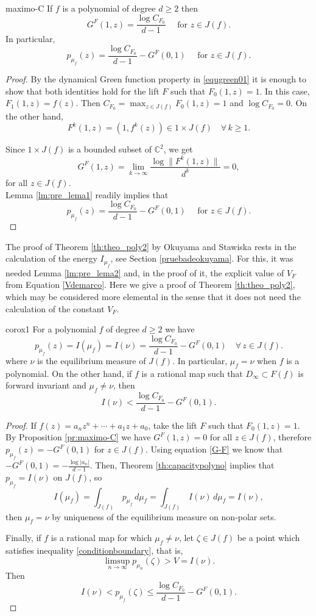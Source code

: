 \begin{myprop}{}{maximo-C}
If $f$ is a polynomial of degree $d\geq 2$ then
$$ G^F(1,z) =  \frac{\log C_{F_0}}{d-1} \quad \text{ for } z\in J(f).$$
In particular,
$$p_{\mu_f}(z) = \frac{\log C_{F_0}}{d-1}-G^F(0,1) \quad \text{ for } z\in J(f).$$
\end{myprop}
\begin{proof}
By the dynamical Green function property in \eqref{equgreen01} it is enough to show that both identities hold for the lift $F$ such that $F_0(1,z)=1$. In this case, $F_1(1,z)=f(z)$. Then $C_{F_0}=\max_{z\in J(f)}F_0(1,z)=1$ and $\log C_{F_0}=0$. On the other hand,
$$F^k(1,z) = (1,f^k(z))\in 1\times J(f) \quad \forall\, k\geq 1.$$

Since $1\times J(f)$ is a bounded subset of $\mathbb{C}^2$, we get
$$G^F(1,z) = \lim_{k\rightarrow \infty} \frac{\log\|F^k(1,z)\|}{d^k}=0,$$
for all $z\in J(f)$.\\

Lemma \ref{lm:pre_lema1} readily implies that
$$p_{\mu_f}(z) = \frac{\log C_{F_0}}{d-1}-G^F(0,1) \quad \text{ for } z\in J(f).$$
\end{proof}

The proof of Theorem \ref{th:theo_poly2} by Okuyama and Stawiska rests in the calculation of the energy $I_{\mu_f}$, see Section \ref{pruebadeokuyama}. For this, it was needed Lemma \ref{lm:pre_lema2} and, in the proof of it, the explicit value of $V_F$ from Equation \eqref{Vdemarco}. Here we give a proof of Theorem \ref{th:theo_poly2}, which may be considered more elemental in the sense that it does not need the calculation of the constant $V_F$.\\

\begin{mycoro}{}{corox1}
For a polynomial $f$ of degree $d\geq 2$ we have
$$p_{\mu_f}(z) = I(\mu_f) = I(\nu) = \frac{\log C_{F_0}}{d-1}-G^F(0,1) \quad \forall \,z\in J(f).$$
where $\nu$ is the equilibrium measure of $J(f)$. In particular, $\mu_f=\nu$ when $f$ is a polynomial. On the other hand, if $f$ is a rational map such that $D_\infty\subset F(f)$ is forward invariant and $\mu_f\neq \nu$, then
$$I(\nu) < \frac{\log C_{F_0}}{d-1}-G^F(0,1).$$
\end{mycoro}

\begin{proof}
If $f(z)=a_nz^n+\cdots+a_1z+a_0$, take the lift $F$ such that $F_0(1,z)=1$. By Proposition \ref{pr:maximo-C} we have $G^F(1,z)=0$ for all $z\in J(f)$, therefore $p_{\mu_f}(z) = -G^F(0,1)$ for $z\in J(f)$. Using equation \eqref{G-F} we know that $-G^F(0,1) = -\frac{\log|a_n|}{d-1}$. Then, Theorem \ref{th:capacitypolyno} implies that $p_{\mu_f}=I(\nu)$ on $J(f)$, so
$$I(\mu_f) = \int_{J(f)}\,p_{\mu_f}\,d\mu_f = \int_{J(f)}\,I(\nu)\,d\mu_f=I(\nu),$$
then $\mu_f=\nu$ by uniqueness of the equilibrium measure on non-polar sets.

Finally, if $f$ is a rational map for which $\mu_f\neq \nu$, let $\zeta\in J(f)$ be a point which satisfies inequality \eqref{conditionboundary}, that is,
$$\limsup_{n\rightarrow \infty} p_{\mu_n}(\zeta) > V=I(\nu).$$
Then
$$I(\nu)<p_{\mu_f}(\zeta) \leq \frac{\log C_{F_0}}{d-1}-G^F(0,1).$$

\end{proof}

